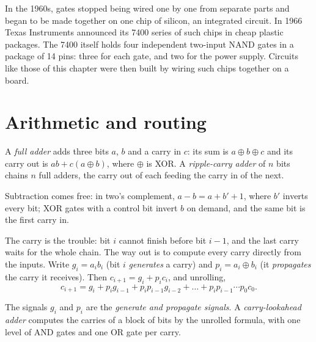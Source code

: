\begin{history}
In the 1960s, gates stopped being wired one by one from separate parts and began to be made together on one chip of
silicon, an integrated circuit. In 1966 Texas Instruments announced its 7400 series of such chips in cheap plastic
packages. The 7400 itself holds four independent two-input NAND gates in a package of 14 pins: three for each gate,
and two for the power supply. Circuits like those of this chapter were then built by wiring such chips together on a
board.
\end{history}


\section{Arithmetic and routing}\label{sec:b1:combinational-circuits:arithmetic}

\begin{definition}\label{def:b1:combinational-circuits:adder}
A \emph{full adder} adds three bits $a$, $b$ and a carry in $c$: its sum is $a \oplus b \oplus c$ and its
carry out is $ab + c(a \oplus b)$, where $\oplus$ is XOR. A \emph{ripple-carry adder} of $n$
bits chains $n$ full adders, the carry out of each feeding the carry in of the next.
\end{definition}

Subtraction comes free: in two's complement, $a - b = a + b' + 1$, where $b'$ inverts every bit; XOR gates with a control
bit invert $b$ on demand, and the same bit is the first carry in.

The carry is the trouble: bit $i$ cannot finish before bit $i - 1$, and the last carry waits for the whole chain. The way
out is to compute every carry directly from the inputs. Write $g_i = a_i b_i$ (bit $i$ \emph{generates} a carry) and
$p_i = a_i \oplus b_i$ (it \emph{propagates} the carry it receives). Then $c_{i+1} = g_i + p_i c_i$, and unrolling,
\[ c_{i+1} = g_i + p_i g_{i-1} + p_i p_{i-1} g_{i-2} + \dots + p_i p_{i-1} \cdots p_0 c_0. \]

\begin{definition}\label{def:b1:combinational-circuits:lookahead}
The signals $g_i$ and $p_i$ are the \emph{generate and propagate signals}. A
\emph{carry-lookahead adder} computes the carries of a block of bits by the unrolled formula,
with one level of AND gates and one OR gate per carry.
\end{definition}

